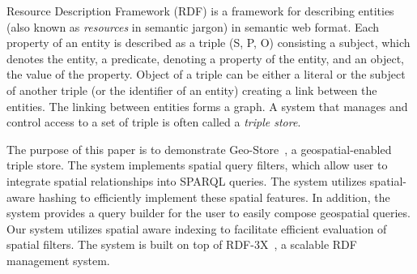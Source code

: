 Resource Description Framework (RDF) is a framework for describing entities (also known as \emph{resources} in semantic jargon) in semantic web format. Each property of an entity is described as a triple (S, P, O) consisting a subject, which denotes the entity, a predicate, denoting a property of the entity, and an object, the value of the property. Object of a triple can be either a literal or the subject of another triple (or the identifier of an entity) creating a link between the entities. The linking between entities forms a graph. A system that manages and control access to a set of triple is often called a \emph{triple store}.

The purpose of this paper is to demonstrate Geo-Store~\cite{journals/internet/KuCWL}, a geospatial-enabled triple store. The system implements spatial query filters, which allow user to integrate spatial relationships into SPARQL queries. The system utilizes spatial-aware hashing to efficiently implement these spatial features. In addition, the system provides a query builder for the user to easily compose geospatial queries. Our system utilizes spatial aware indexing to facilitate efficient evaluation of spatial filters. The system is built on top of RDF-3X~\cite{DBLP:journals/vldb/NeumannW10}, a scalable RDF management system. 